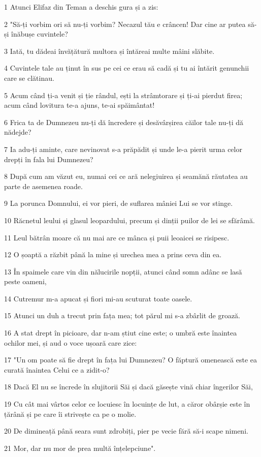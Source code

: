 \par 1 Atunci Elifaz din Teman a deschis gura și a zis:
\par 2 "Să-ți vorbim ori să nu-ți vorbim? Necazul tău e crâncen! Dar cine ar putea să-și înăbușe cuvintele?
\par 3 Iată, tu dădeai învățătură multora și întăreai multe mâini slăbite.
\par 4 Cuvintele tale au ținut în sus pe cei ce erau să cadă și tu ai întărit genunchii care se clătinau.
\par 5 Acum când ți-a venit și ție rândul, ești la strâmtorare și ți-ai pierdut firea; acum când lovitura te-a ajuns, te-ai spăimântat!
\par 6 Frica ta de Dumnezeu nu-ți dă încredere și desăvârșirea căilor tale nu-ți dă nădejde?
\par 7 Ia adu-ți aminte, care nevinovat s-a prăpădit și unde le-a pierit urma celor drepți în fala lui Dumnezeu?
\par 8 După cum am văzut eu, numai cei ce ară nelegiuirea și seamănă răutatea au parte de asemenea roade.
\par 9 La porunca Domnului, ei vor pieri, de suflarea mâniei Lui se vor stinge.
\par 10 Răcnetul leului și glasul leopardului, precum și dinții puilor de lei se sfărâmă.
\par 11 Leul bătrân moare că nu mai are ce mânca și puii leoaicei se risipesc.
\par 12 O șoaptă a răzbit până la mine și urechea mea a prins ceva din ea.
\par 13 În spaimele care vin din nălucirile nopții, atunci când somn adânc se lasă peste oameni,
\par 14 Cutremur m-a apucat și fiori mi-au scuturat toate oasele.
\par 15 Atunci un duh a trecut prin fața mea; tot părul mi s-a zbârlit de groază.
\par 16 A stat drept în picioare, dar n-am știut cine este; o umbră este înaintea ochilor mei, și aud o voce ușoară care zice:
\par 17 "Un om poate să fie drept în fața lui Dumnezeu? O făptură omenească este ea curată înaintea Celui ce a zidit-o?
\par 18 Dacă El nu se încrede în slujitorii Săi și dacă găsește vină chiar îngerilor Săi,
\par 19 Cu cât mai vârtos celor ce locuiesc în locuințe de lut, a căror obârșie este în țărână și pe care îi strivește ca pe o molie.
\par 20 De dimineață până seara sunt zdrobiți, pier pe vecie fără să-i scape nimeni.
\par 21 Mor, dar nu mor de prea multă înțelepciune".

